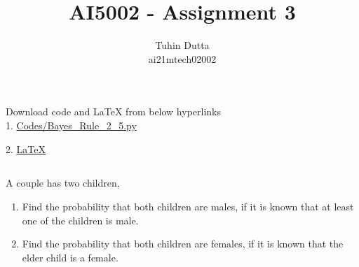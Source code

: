 \documentclass[journal,12pt,twocolumn]{IEEEtran}
\begin{document}
\providecommand{\mtx}[1]{\mathbf{#1}}
\providecommand{\fourier}{\overset{\mathcal{F}}{ \rightleftharpoons}}
\providecommand{\system}{\overset{\mathcal{H}}{ \longleftrightarrow}}
\newcommand{\solution}{\noindent \textbf{Solution: }}
\newcommand{\cosec}{\,\text{cosec}\,}
\providecommand{\dec}[2]{\ensuremath{\overset{#1}{\underset{#2}{\gtrless}}}}
\newcommand{\myvec}[1]{\ensuremath{\begin{pmatrix}#1\end{pmatrix}}}
\newcommand{\mydet}[1]{\ensuremath{\begin{vmatrix}#1\end{vmatrix}}}
\makeatletter
{}
\makeatother
\let\StandardTheFigure\thefigure
\let\vec\mathbf
\renewcommand{\thefigure}{\theproblem}
\def\putbox#1#2#3{\makebox[0in][l]{\makebox[#1][l]{}\raisebox{\baselineskip}[0in][0in]{\raisebox{#2}[0in][0in]{#3}}}}
     \def\rightbox#1{\makebox[0in][r]{#1}}
     \def\centbox#1{\makebox[0in]{#1}}
     \def\topbox#1{\raisebox{-\baselineskip}[0in][0in]{#1}}
     \def\midbox#1{\raisebox{-0.5\baselineskip}[0in][0in]{#1}}
\vspace{3cm}
\title{AI5002 - Assignment 3}
\author{Tuhin Dutta\\ ai21mtech02002}
\maketitle
\newpage
\bigskip
\renewcommand{\thefigure}{\theenumi}
\renewcommand{\thetable}{\theenumi}
\begin{mdframed}
Download code and LaTeX from below hyperlinks\\
1. \href{https://github.com/Tauhait/AI5002/blob/main/Assignment-3/Codes/Bayes_Rule_2_5.py}{Codes/Bayes\_Rule\_2\_5.py}


2. \href{https://github.com/Tauhait/AI5002/tree/main/Assignment-3/LaTeX}{LaTeX}
\end{mdframed}
\subsection*{}
A couple has two children,\\
\begin{enumerate}[label=\roman*.]
\item Find the probability that both children are
males, if it is known that at least one of the
children is male.
\item Find the probability that both children are
females, if it is known that the elder child is
a female.
\end{enumerate}
\end{document}
